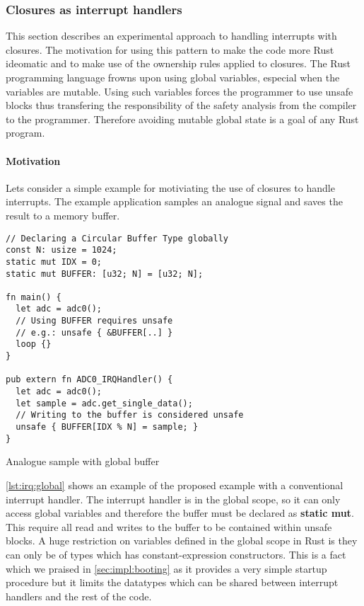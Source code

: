 \subsubsection{Closures as interrupt handlers}
\label{sec:irq-closures}

This section describes an experimental approach to handling interrupts with closures.
The motivation for using this pattern to make the code more Rust ideomatic and to make use of the ownership rules applied to closures.
The Rust programming language frowns upon using global variables, especial when the variables are mutable.
Using such variables forces the programmer to use unsafe blocks thus transfering the responsibility of the safety analysis from the compiler to the programmer.
Therefore avoiding mutable global state is a goal of any Rust program.

\paragraph{Motivation}
\label{par:irq:motivation}

Lets consider a simple example for motiviating the use of closures to handle interrupts.
The example application samples an analogue signal and saves the result to a memory buffer.

\begin{listing}[H]
  \begin{verbatim}
// Declaring a Circular Buffer Type globally
const N: usize = 1024;
static mut IDX = 0;
static mut BUFFER: [u32; N] = [u32; N];

fn main() {
  let adc = adc0();
  // Using BUFFER requires unsafe
  // e.g.: unsafe { &BUFFER[..] }
  loop {}
}

pub extern fn ADC0_IRQHandler() {
  let adc = adc0();
  let sample = adc.get_single_data();
  // Writing to the buffer is considered unsafe
  unsafe { BUFFER[IDX % N] = sample; }
}
  \end{verbatim}
  \caption{Analogue sample with global buffer}
  \label{lst:irq:global}
\end{listing}

\autoref{lst:irq:global} shows an example of the proposed example with a conventional interrupt handler.
The interrupt handler is in the global scope, so it can only access global variables and therefore the buffer must be declared as \textbf{static mut}.
This require all read and writes to the buffer to be contained within unsafe blocks.
A huge restriction on variables defined in the global scope in Rust is they can only be of types which has constant-expression constructors.
This is a fact which we praised in \autoref{sec:impl:booting} as it provides a very simple startup procedure but it limits the datatypes which can be shared between interrupt handlers and the rest of the code.

